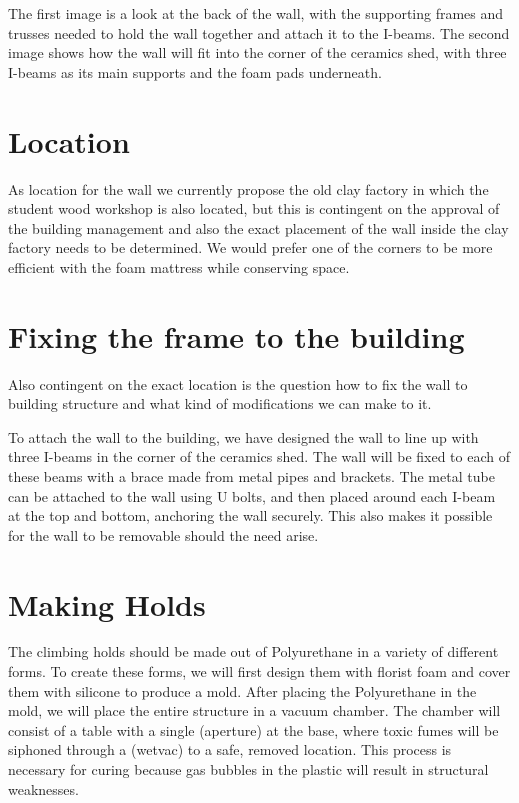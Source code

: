 \documentclass{scrartcl}
\begin{document}
The first image is a look at the back of the wall, with the supporting frames and trusses needed to hold the wall together and attach it to the I-beams. The second image shows how the wall will fit into the corner of the ceramics shed, with three I-beams as its main supports and the foam pads underneath.

\section{Location}
As location for the wall we currently propose the old clay factory in which the student wood workshop is also located, but this is contingent on the approval of the building management and also the exact placement of the wall inside the clay factory needs to be determined. We would prefer one of the corners to be more efficient with the foam mattress while conserving space.

\section{Fixing the frame to the building}
Also contingent on the exact location is the question how to fix the wall to building structure and what kind of modifications we can make to it.

To attach the wall to the building, we have designed the wall to line up with three I-beams in the corner of the ceramics shed. The wall will be fixed to each of these beams with a brace made from metal pipes and brackets. The metal tube can be attached to the wall using U bolts, and then placed around each I-beam at the top and bottom, anchoring the wall securely. This also makes it possible for the wall to be removable should the need arise.

\section{Making Holds}
The climbing holds should be made out of Polyurethane in a variety of different forms. To create these forms, we will first design them with florist foam and cover them with silicone to produce a mold. After placing the Polyurethane in the mold, we will place the entire structure in a vacuum chamber. The chamber will consist of a table with a single (aperture) at the base, where toxic fumes will be siphoned through a (wetvac) to a safe, removed location. This process is necessary for curing because gas bubbles in the plastic will result in structural weaknesses. 
\end{document}

